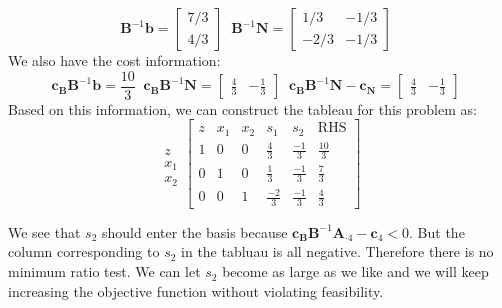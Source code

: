 \begin{example}
\begin{displaymath}
\mathbf{B}^{-1}\mathbf{b} = \begin{bmatrix}7/3 \\ 4/3\end{bmatrix}\;\;
\mathbf{B}^{-1}\mathbf{N} = \begin{bmatrix}1/3 & -1/3 \\ -2/3 & -1/3\end{bmatrix}\;\;
\end{displaymath}
We also have the cost information:
\begin{displaymath}
\mathbf{c_B}\mathbf{B}^{-1}\mathbf{b} = \frac{10}{3}\;\;
\mathbf{c_B}\mathbf{B}^{-1}\mathbf{N} = \begin{bmatrix}\frac{4}{3} & -\frac{1}{3}
\end{bmatrix}\;\;
\mathbf{c_B}\mathbf{B}^{-1}\mathbf{N}-\mathbf{c_N} = \begin{bmatrix}\frac{4}{3} & -\frac{1}{3}
\end{bmatrix}\;\;
\end{displaymath}
Based on this information, we can construct the tableau for this problem as:
\begin{equation}
\begin{array}{c}
\\
z\\
x_1\\
x_2
\end{array}
\left[
\begin{array}{c|cccc|c}
z& x_1 & x_2 & s_1 & s_2 & \text{RHS}\\
\hline
1 &  0 &  0 & \frac{4}{3} & \frac{-1}{3} & \frac{10}{3}\\
\hline
0 &  1 &  0 & \frac{1}{3} & \frac{-1}{3} & \frac{7}{3}\\
0 &  0 &  1 & \frac{-2}{3} & \frac{-1}{3} & \frac{4}{3}
\end{array}\right]
\end{equation}

We see that $s_2$ should enter the basis because $\mathbf{c_B}\mathbf{B}^{-1}\mathbf{A}_{\cdot 4}-\mathbf{c}_4 < 0$. But the column corresponding to $s_2$ in the tabluau is all negative. Therefore there is no minimum ratio test. We can let $s_2$ become as large as we like and we will keep increasing the objective function without violating feasibility. 


\end{example}
